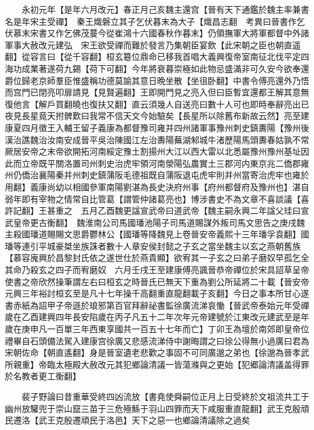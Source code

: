 　　永初元年【是年六月改元】春正月己亥魏主還宫【晉有天下通鑑於魏主率兼書名是年宋主受禪】　秦王熾磐立其子乞伏暮末為大子【熾昌志翻　考異曰晉書作乞伏慕末宋書又作乞佛茂蔓今從崔鴻十六國春秋作暮末】仍領撫軍大將軍都督中外諸軍事大赦改元建弘　宋王欲受禪而難於發言乃集朝臣宴飲【此宋朝之臣也朝直遥翻】從容言曰【從千容翻】桓玄簒位鼎命已移我首唱大義興復帝室南征北伐平定四海功成業著遂荷九錫【荷下可翻】今年將衰暮崇極如此物忌盛滿非可久安今欲奉還爵位歸老京師羣臣惟盛稱功德莫諭其意日晩坐散【坐徂卧翻】中書令傅亮還外乃悟而宫門已閉亮叩扉請見【見賢遍翻】王即開門見之亮入但曰臣暫宜還都王解其意無復他言【解戶買翻曉也復扶又翻】直云須幾人自送亮曰數十人可也即時奉辭亮出已夜見長星竟天拊髀歎曰我常不信天文今始驗矣【長星所以除舊布新故云然】亮至建康夏四月徵王入輔王留子義康為都督豫司雍并四州諸軍事豫州刺史鎮夀陽【豫州後漢治譙魏治汝南安成晉平吳治陳國江左治夀陽蕪湖邾城牛渚歷陽馬頭夀春姑孰不常厥居安帝之末帝欲開拓河南綏定豫土割揚州大江以西大雷以北悉屬豫州豫州基址因此而立帝既平關洛置司州刺史治虎牢領河南滎陽弘農實土三郡河内東京兆二僑郡雍州仍僑治襄陽秦并州刺史鎮蒲阪毛德祖既自蒲阪退屯虎牢則并州當寄治虎牢也雍於用翻】義康尚幼以相國參軍南陽劉湛為長史決府州事【府州都督府及豫州也】湛自弱年即有宰物之情常自比管葛【謂管仲諸葛亮也】博涉書史不為文章不喜談議【喜許記翻】王甚重之　五月乙酉魏更諡宣武帝曰道武帝【魏主嗣永興二年諡父珪曰宣武皇帝更古衡翻】　魏淮南公司馬國璠池陽子司馬道賜謀外叛司馬文思告之庚戌魏主殺國璠道賜賜文思爵鬱林公【國璠等降魏見上卷晉安帝義熙十三年璠孚袁翻】國璠等連引平城豪桀坐族誅者數十人章安侯封懿之子玄之當坐魏主以玄之燕朝舊族【慕容廆興於昌黎封氏依之遂世仕於燕貴顯】欲宥其一子玄之曰弟子磨奴早孤乞全其命乃殺玄之四子而宥磨奴　六月壬戌王至建康傅亮諷晉恭帝禪位於宋具詔草呈帝使書之帝欣然操筆謂左右曰桓玄之時晉氏已無天下重為劉公所延將二十載【晉安帝元興三年裕討桓玄至是凡十七年操千高翻重直龍翻載子亥翻】今日之事本所甘心遂書赤紙為詔甲子帝遜於琅邪第百官拜辭祕書監徐廣流涕哀慟【晉武帝泰始元年受禪歲在乙酉建興四年長安陷歲在丙子凡五十二年次年元帝建號於江東改元建武至是年歲在庚申凡一百單三年西東享國共一百五十七年而亡】丁卯王為壇於南郊即皇帝位禮畢自石頭備法駕入建康宫徐廣又悲感流涕侍中謝晦謂之曰徐公得無小過廣曰君為宋朝佐命【朝直遙翻】身是晉室遺老悲歡之事固不可同廣邈之弟也【徐邈為晉孝武所親重】帝臨太極殿大赦改元其犯鄉論清議一皆蕩滌與之更始【犯郷論清議盖得罪於名教者更工衡翻】

　　裴子野論曰昔重華受終四凶流放【書堯使舜嗣位正月上日受終於文祖流共工于幽州放驩兜于崇山竄三苗于三危殛鯀于羽山四罪而天下咸服重直龍翻】武王克殷頑民遷洛【武王克殷遷頑民于洛邑】天下之惡一也鄉論清議除之過矣

